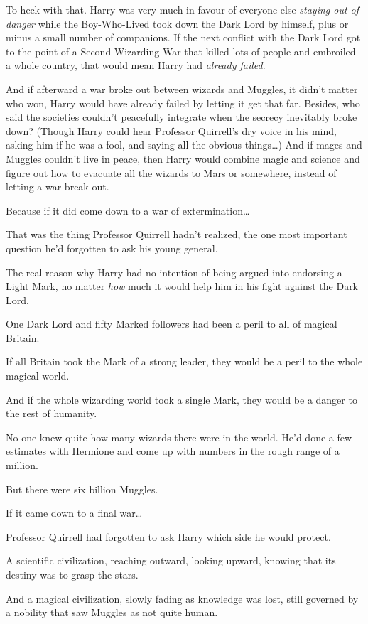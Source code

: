 To heck with that. Harry was very much in favour of everyone else \emph{staying
out of danger} while the Boy-Who-Lived took down the Dark Lord by himself, plus
or minus a small number of companions. If the next conflict with the Dark Lord
got to the point of a Second Wizarding War that killed lots of people and
embroiled a whole country, that would mean Harry had \emph{already failed}.

And if afterward a war broke out between wizards and Muggles, it didn't matter
who won, Harry would have already failed by letting it get that far. Besides,
who said the societies couldn't peacefully integrate when the secrecy
inevitably broke down? (Though Harry could hear Professor Quirrell's dry voice
in his mind, asking him if he was a fool, and saying all the obvious
things{\ldots}) And if mages and Muggles couldn't live in peace, then Harry
would combine magic and science and figure out how to evacuate all the wizards
to Mars or somewhere, instead of letting a war break out.

Because if it did come down to a war of extermination{\ldots}

That was the thing Professor Quirrell hadn't realized, the one most important
question he'd forgotten to ask his young general.

The real reason why Harry had no intention of being argued into endorsing a
Light Mark, no matter \emph{how} much it would help him in his fight against
the Dark Lord.

One Dark Lord and fifty Marked followers had been a peril to all of magical
Britain.

If all Britain took the Mark of a strong leader, they would be a peril to the
whole magical world.

And if the whole wizarding world took a single Mark, they would be a danger to
the rest of humanity.

No one knew quite how many wizards there were in the world. He'd done a few
estimates with Hermione and come up with numbers in the rough range of a
million.

But there were six billion Muggles.

If it came down to a final war{\ldots}

Professor Quirrell had forgotten to ask Harry which side he would protect.

A scientific civilization, reaching outward, looking upward, knowing that its
destiny was to grasp the stars.

And a magical civilization, slowly fading as knowledge was lost, still governed
by a nobility that saw Muggles as not quite human.

